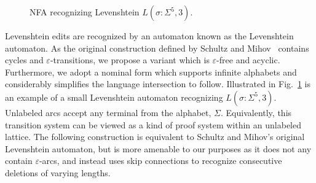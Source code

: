 \documentclass[sigplan,review,acmsmall,nonacm,anonymous]{acmart}\settopmatter{printfolios=false,printccs=false,printacmref=false}
\begin{document}
  \begin{figure}
    \vspace{-0.3cm}
    \begin{center}
      
    \end{center}
    \caption{NFA recognizing Levenshtein $L(\sigma: \Sigma^5, 3)$.}\label{fig:lev_nfa}
    \vspace{-0.5cm}
  \end{figure}

  Levenshtein edits are recognized by an automaton known as the Levenshtein automaton. As the original construction defined by Schultz and Mihov~\cite{schulz2002fast} contains cycles and $\varepsilon$-transitions, we propose a variant which is $\varepsilon$-free and acyclic. Furthermore, we adopt a nominal form which supports infinite alphabets and considerably simplifies the language intersection to follow. Illustrated in Fig.~\ref{fig:lev_nfa} is an example of a small Levenshtein automaton recognizing $L(\sigma: \Sigma^5, 3)$. Unlabeled arcs accept any terminal from the alphabet, $\Sigma$. Equivalently, this transition system can be viewed as a kind of proof system within an unlabeled lattice. The following construction is equivalent to Schultz and Mihov's original Levenshtein automaton, but is more amenable to our purposes as it does not any contain $\varepsilon$-arcs, and instead uses skip connections to recognize consecutive deletions of varying lengths.

\end{document}

